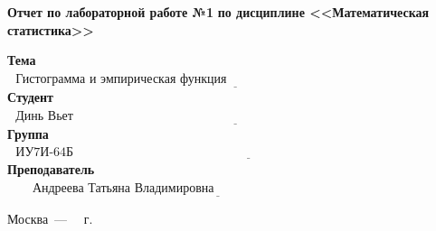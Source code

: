 \begin{titlepage}
	\begin{center}
		\noindent\begin{minipage}{1.1\textwidth}\centering
			\Large\textbf{  Отчет по лабораторной работе №1}\newline
			\textbf{по дисциплине <<Математическая статистика>>}\newline\newline
		\end{minipage}
	\end{center}
	
	\noindent\textbf{Тема} $\underline{\text{~~Гистограмма и эмпирическая функция распределения~~~~~~~~~~~~~~~~~~~~~~~~~~~~~~~~~~~~~~~~}}$\newline\newline
	\noindent\textbf{Студент} $\underline{\text{~~Динь Вьет Ань~~~~~~~~~~~~~~~~~~~~~~~~~~~~~~~~~~~~~~~~~~~~~~~~~~~~~~~~~~~~~~~~~~~~~~~~~~~~~~~~~~~~~~~~}}$\newline\newline
	\noindent\textbf{Группа} $\underline{\text{~~ИУ7И-64Б~~~~~~~~~~~~~~~~~~~~~~~~~~~~~~~~~~~~~~~~~~~~~~~~~~~~~~~~~~~~~~~~~~~~~~~~~~~~~~~~~~~~~~~~~~~~~~~~~~~}}$\newline\newline
	\noindent\textbf{Преподаватель} $\underline{\text{~~~~~~Андреева Татьяна Владимировна~~~~~~~~~~~~~~~~~~~~~~~~~~~~~~~~~~~~~~~~~~~~~~~~~~~}}$\newline\newline\newline
	
\begin{center}
	\vfill
	Москва~---~\the\year
	~г.
\end{center}

\end{titlepage}